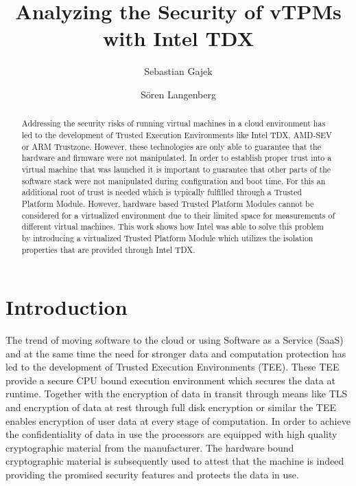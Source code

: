 \documentclass[sigplan,screen,nonacm]{acmart}
\begin{document}
\title{Analyzing the Security of vTPMs with Intel TDX}


\author{Sebastian Gajek} 


\author{Sören Langenberg} 



\begin{abstract}
Addressing the security risks of running virtual machines in a cloud environment has led to the development of Trusted Execution Environments like Intel TDX, AMD-SEV or ARM Trustzone.
However, these technologies are only able to guarantee that the hardware and firmware were not manipulated.
In order to establish proper trust into a virtual machine that was launched it is important to guarantee that other parts of the software stack were not manipulated during configuration and boot time.
For this an additional root of trust is needed which is typically fulfilled through a Trusted Platform Module.
However, hardware based Trusted Platform Modules cannot be considered for a virtualized environment due to their limited space for measurements of different virtual machines.
This work shows how Intel was able to solve this problem by introducing a virtualized Trusted Platform Module which utilizes the isolation properties that are provided through Intel TDX.
\end{abstract}


\maketitle

\section{Introduction}
The trend of moving software to the cloud or using Software as a Service (SaaS) and at the same time the need for stronger data and computation protection has led to the development of Trusted Execution Environments (TEE).
These TEE provide a secure CPU bound execution environment which secures the data at runtime.
Together with the encryption of data in transit through means like TLS and encryption of data at rest through full disk encryption or similar the TEE enables encryption of user data at every stage of computation.
In order to achieve the confidentiality of data in use the processors are equipped with high quality cryptographic material from the manufacturer.
The hardware bound cryptographic material is subsequently used to attest that the machine is indeed providing the promised security features and protects the data in use.
\end{document}
